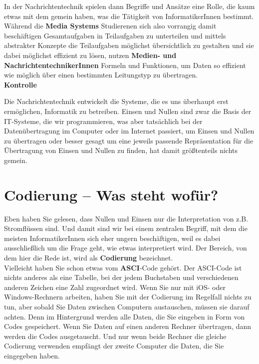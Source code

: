 In der Nachrichtentechnik spielen dann Begriffe und Ansätze eine Rolle, die kaum etwas mit dem gemein haben, was die Tätigkeit von InformatikerInnen bestimmt. Während die \textbf{Media Systems} Studierenen sich also vorrangig damit beschäftigen Gesamtaufgaben in Teilaufgaben zu unterteilen und mittels abstrakter Konzepte die Teilaufgaben möglichst übersichtlich zu gestalten und sie dabei möglichst effizient zu lösen, nutzen \textbf{Medien- und NachrichtentechnikerInnen} Formeln und Funktionen, um Daten so effizient wie möglich über einen bestimmten Leitungstyp zu übertragen.\\

\textbf{Kontrolle}

Die Nachrichtentechnik entwickelt die Systeme, die es uns überhaupt erst ermöglichen, Informatik zu betreiben. Einsen und Nullen sind zwar die Basis der IT-Systeme, die wir programmieren, was aber tatsächlich bei der Datenübertragung im Computer oder im Internet passiert, um Einsen und Nullen zu übertragen oder besser gesagt um eine jeweils passende Repräsentation für die Übertragung von Einsen und Nullen zu finden, hat damit größtenteils nichts gemein.

\section{Codierung – Was steht wofür?}
Eben haben Sie gelesen, dass Nullen und Einsen nur die Interpretation von z.B. Stromflüssen sind. Und damit sind wir bei einem zentralen Begriff, mit dem die meisten InformatikerInnen sich eher ungern beschäftigen, weil es dabei ausschließlich um die Frage geht, wie etwas interpretiert wird. Der Bereich, von dem hier die Rede ist, wird als \textbf{Codierung} bezeichnet.\\

Vielleicht haben Sie schon etwas vom \textbf{ASCI}-Code gehört. Der ASCI-Code ist nichts anderes als eine Tabelle, bei der jedem Buchstaben und verschiedenen anderen Zeichen eine Zahl zugeordnet wird. Wenn Sie nur mit iOS- oder Windows-Rechnern arbeiten, haben Sie mit der Codierung im Regelfall nichts zu tun, aber sobald Sie Daten zwischen Computern austauschen, müssen sie darauf achten. Denn im Hintergrund werden alle Daten, die Sie eingeben in Form von Codes gespeichert. Wenn Sie Daten auf einen anderen Rechner übertragen, dann werden die Codes ausgetauscht. Und nur wenn beide Rechner die gleiche Codierung verwenden empfängt der zweite Computer die Daten, die Sie eingegeben haben.\\

